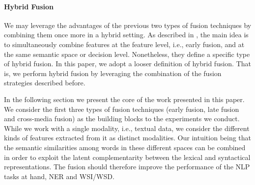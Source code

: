 \documentclass{llncs}
\begin{document}
\paragraph{Hybrid Fusion}
We may leverage the advantages of the previous two types of fusion techniques by combining them once more in a hybrid setting. As described in \cite{AtreyHEK10,yu2014informedia}, the main idea is to simultaneously combine features at the feature level, i.e., early fusion, and at the same semantic space or decision level. Nonetheless, they define a specific type of hybrid fusion. In this paper, we adopt a looser definition of hybrid fusion. That is, we perform hybrid fusion by leveraging the combination of the fusion strategies described before.
%
%




In the following section we present the core of the work presented in this paper. We consider the first three types of fusion techniques (early fusion, late fusion and cross-media fusion) as the building blocks to the experiments we conduct.  While we work with a single modality, i.e., textual data, we consider the different kinds of features extracted from it as distinct modalities. Our intuition being that the semantic similarities among words in these different spaces can be combined in order to exploit the latent complementarity between the lexical and syntactical representations. The fusion should therefore improve the performance of the NLP tasks at hand, NER and WSI/WSD.
\end{document}
